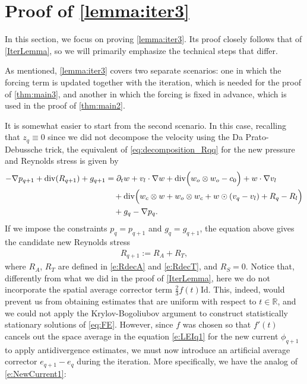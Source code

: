 \documentclass[10pt,a4paper]{amsart}
\numberwithin{equation}{section}
\numberwithin{corollario}{section}
\numberwithin{lemma}{section}
\numberwithin{prop}{section}
\theoremstyle{definition}
\theoremstyle{remark}
\newcommand{\R}{\mathbb{R}}
\newcommand{\dvg}{\mathord{{\rm div}}}
\newcommand{\Id}{\mathrm{Id}}
\newcommand{\qq}{_{q+1}}
\newcommand{\SymOt}{\odot}
\begin{document}
\section{Proof of \autoref{lemma:iter3}} \label{sec:forced}

In this section, we focus on proving \autoref{lemma:iter3}. Its proof closely follows that of \autoref{IterLemma}, so we will primarily emphasize the technical steps that differ.

As mentioned, \autoref{lemma:iter3} covers two separate scenarios: one in which the forcing term is updated together with the iteration, which is needed for the proof of \autoref{thm:main3}, and another in which the forcing is fixed in advance, which is used in the proof of \autoref{thm:main2}.

It is somewhat easier to start from the second scenario. In this case, recalling that $z_q \equiv0$ since we did not decompose the velocity using the Da Prato-Debussche trick, the equivalent of \eqref{eq:decomposition_Rqq} for the new pressure and Reynolds stress is given by 
    \begin{align}
        -\nabla p\qq+\dvg(R\qq)+g\qq
        &=
        \partial_t w+v_l\cdot \nabla w+\dvg\Big(w_o\otimes w_o-c_0\Big)+w\cdot \nabla v_l
        \\
        &\quad+
        \dvg\Big(w_c\otimes w+w_o\otimes w_c+w\SymOt (v_q-v_l)+R_q-R_l\Big)
        \\
        &\quad+ g_q-\nabla p_q.
    \end{align}
If we impose the constraints $p_q = p\qq$ and $g_q = g\qq$, the equation above gives the candidate new Reynolds stress    
\begin{align}
    R\qq := R_A + R_T,
\end{align}
where $R_A$, $R_T$ are defined in \eqref{e:RdecA} and \eqref{e:RdecT}, and $R_S = 0$. Notice that, differently from what we did in the proof of \autoref{IterLemma}, here we do not incorporate the spatial average corrector term $\frac{2}{3}f(t)\Id$.
This, indeed, would prevent us from obtaining estimates that are uniform with respect to $t \in \R$, and we could not apply the Krylov-Bogoliubov argument to construct statistically stationary solutions of \eqref{eq:FE}. 
However, since $f$ was chosen so that $f'(t)$ cancels out the space average in the equation \eqref{e:LEIq1} for the new current $\phi\qq$ to apply antidivergence estimates, we must now introduce an artificial average corrector $e\qq-e_q$ during the iteration. More specifically, we have the analog of \eqref{e:NewCurrent1}:
\end{document}
